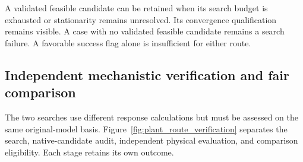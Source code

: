 A validated feasible candidate can be retained when its search budget is exhausted or stationarity remains unresolved. Its convergence qualification remains visible. A case with no validated feasible candidate remains a search failure. A favorable success flag alone is insufficient for either route.

\subsection{Independent mechanistic verification and fair comparison}

The two searches use different response calculations but must be assessed on the same original-model basis. Figure~\ref{fig:plant_route_verification} separates the search, native-candidate audit, independent physical evaluation, and comparison eligibility. Each stage retains its own outcome.

